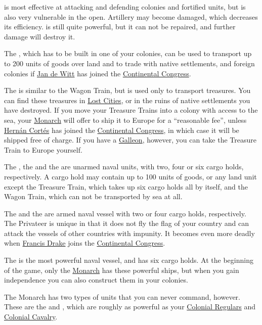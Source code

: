 \documentclass[12pt]{book}
\begin{document}
 is most effective at attacking and defending colonies
and fortified units, but is also very vulnerable in the
open. Artillery may become damaged, which decreases its
efficiency.  is still quite powerful, but it
can not be repaired, and further damage will destroy it.

The , which has to be built in one of your colonies,
can be used to transport up to 200 units of goods over land and to
trade with native settlements, and foreign colonies if \hyperlink{Jan
de Witt}{Jan de Witt} has joined the \hyperlink{Continental
Congress}{Continental Congress}.

The  is similar to the Wagon Train, but is used
only to transport treasures. You can find these treasures in
\hyperlink{Lost City Rumours}{Lost Cities}, or in the ruins of native
settlements you have destroyed. If you move your Treasure Trains into
a colony with access to the sea, your \hyperlink{Monarch}{Monarch}
will offer to ship it to Europe for a ``reasonable fee'', unless
\hyperlink{Hernan Cortes}{Hern\'an Cort\'es} has joined the
\hyperlink{Continental Congress}{Continental Congress}, in which case
it will be shipped free of charge. If you have a
\hyperlink{Galleon}{Galleon}, however, you can take the Treasure Train
to Europe yourself.

The , the  and the  are
unarmed \hypertarget{Naval Units}{naval units}, with two, four or six
cargo holds, respectively. A cargo hold may contain up to 100 units of
goods, or any land unit except the Treasure Train, which takes up six
cargo holds all by itself, and the Wagon Train, which can not be
transported by sea at all.

The  and the  are armed naval vessel
with two or four cargo holds, respectively. The Privateer is unique in
that it does not fly the flag of your country and can attack the
vessels of other countries with impunity. It becomes even more deadly
when \hyperlink{Francis Drake}{Francis Drake} joins the
\hyperlink{Continental Congress}{Continental Congress}.

The  is the most powerful naval vessel, and has six
cargo holds. At the beginning of the game, only the
\hyperlink{Monarch}{Monarch} has these powerful ships, but when you gain
independence you can also construct them in your colonies.

The Monarch has two types of units that you can never command,
however. These are the  and , which are roughly as powerful as your \hyperlink{Colonial
Regular}{Colonial Regulars} and \hyperlink{Colonial Cavalry}{Colonial
Cavalry}.
\end{document}
